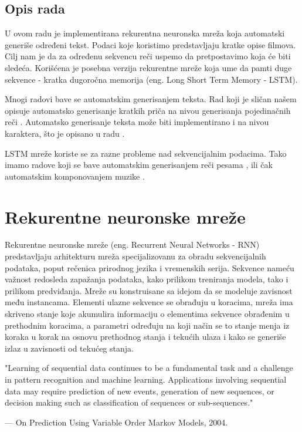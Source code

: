 \documentclass[a4paper]{article}
\begin{document}
\subsection{Opis rada}

U ovom radu je implementirana rekurentna neuronska mreža koja automatski generiše određeni tekst. Podaci koje koristimo predstavljaju kratke opise filmova. Cilj nam je da za određenu sekvencu reči uspemo da pretpostavimo koja će biti sledeća. Korišćena je posebna verzija rekurentne mreže koja ume da pamti duge sekvence - kratka dugoročna memorija (eng. Long Short Term Memory - LSTM). 

Mnogi radovi bave se automatskim generisanjem teksta. Rad koji je sličan našem opisuje automatsko generisanje kratkih priča na nivou generisanja pojedinačnih reči  \cite{pawade2018story}. Automatsko generisanje teksta može biti implementirano i na nivou karaktera, što je opisano u radu \cite{sutskever2011generating}.

LSTM mreže koriste se za razne probleme nad sekvencijalnim podacima. Tako imamo radove koji se bave automatskim generisanjem reči pesama \cite{potash2015ghostwriter}, ili čak automatskim komponovanjem muzike \cite{choi2016text}.

\section{Rekurentne neuronske mreže}
Rekurentne neuronske mreže (eng. Recurrent Neural Networks - RNN) predstavljaju arhitekturu mreža specijalizovanu za obradu sekvencijalnih podataka, poput rečenica prirodnog jezika i vremenskih serija. Sekvence nameću važnost redosleda zapažanja podataka, kako prilikom treniranja modela, tako i prilikom predviđanja. Mreže su konstruisane sa idejom da se modeluje zavisnost među instancama. Elementi ulazne sekvence se obrađuju u koracima, mreža ima skriveno stanje koje akumulira informaciju o elementima sekvence obrađenim u prethodnim koracima, a parametri određuju na koji način se to stanje menja iz koraka u korak na osnovu prethodnog stanja i tekućih ulaza i kako se generiše izlaz u zavisnosti od tekućeg stanja.

"Learning of sequential data continues to be a fundamental task and a challenge in
pattern recognition and machine learning. Applications involving sequential data
may require prediction of new events, generation of new sequences, or decision
making such as classification of sequences or sub-sequences."

     — On Prediction Using Variable Order Markov Models, 2004.
\end{document}
